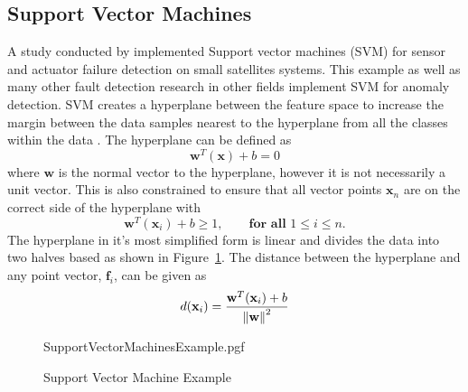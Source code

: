 \subsection{Support Vector Machines}
A study conducted by \cite{colagrossi2022fault} implemented Support vector machines (SVM) for sensor and actuator failure detection on small satellites systems. This example as well as many other fault detection research in other fields implement SVM for anomaly detection. SVM creates a hyperplane between the feature space to increase the margin between the data samples nearest to the hyperplane from all the classes within the data \cite{hearst1998support, meyer2015support}. The hyperplane can be defined as
\begin{equation}
\mathbf{w}^T(\mathbf{x}) + b = 0
\end{equation}
where $\mathbf{w}$ is the normal vector to the hyperplane, however it is not necessarily a unit vector. This is also constrained to ensure that all vector points $\mathbf{x}_n$ are on the correct side of the hyperplane with 
\begin{equation}
\mathbf{w}^T(\mathbf{x}_i) + b \geq 1, \qquad \textbf{for all }  1 \leq i \leq n.
\end{equation}
The hyperplane in it's most simplified form is linear and divides the data into two halves based as shown in Figure~\ref{fig:SupportVectorMachinesExample}. The distance between the hyperplane and any point vector, $\mathbf{f}_i$, can be given as
\begin{equation}
d(\mathbf{x}_i) = \frac{\mathbf{w}^T(\mathbf{x}_i) + b}{\left\lVert\mathbf{w}\right\rVert^2}
\end{equation}

\begin{figure}[!hbt]
	\centering
	{SupportVectorMachinesExample.pgf}
	\caption{Support Vector Machine Example}
	\label{fig:SupportVectorMachinesExample}
\end{figure}

